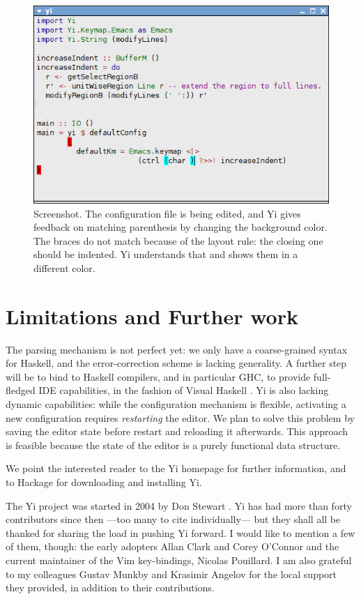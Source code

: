 \documentclass[9pt,indentedstyle]{sigplanconf}
\begin{document}
\begin{figure}
\includegraphics[width=\columnwidth]{screenshot}
\caption{Screenshot. The configuration file is being edited, and Yi
  gives feedback on matching parenthesis by changing the background
  color. The braces do not match because of the layout rule: the
  closing one should be indented. Yi understands that and shows them
  in a different color.}
\label{fig:screenshot}
\end{figure}

\section{Limitations and Further work}

The parsing mechanism is not perfect yet: we only have a coarse-grained
syntax for Haskell, and the error-correction scheme is lacking
generality.  A further step will be to bind to Haskell compilers, and
in particular GHC, to provide full-fledged IDE capabilities, in the
fashion of Visual Haskell \cite{Angelov2005VH}.
\vfill\eject
Yi is also lacking dynamic capabilities: while the configuration
mechanism is flexible, activating a new configuration requires {\em
  restarting} the editor.  We plan to solve this problem by saving the
editor state before restart and reloading it afterwards. This approach is
feasible because the state of the editor is a purely functional data
structure.

We point the interested reader to the Yi homepage \cite{YiHome} for
further information, and to Hackage \cite{Hackage} for downloading and
installing Yi.

\acks 

The Yi project was started in 2004 by Don Stewart
\cite{Stewart2005Dynamic}. Yi has had more than forty contributors
since then ---too many to cite individually--- but
they shall all be thanked for sharing the load in pushing Yi
forward. I would like to mention a few of them, though: the early
adopters Allan Clark and Corey O'Connor and the current maintainer of
the Vim key-bindings, Nicolas Pouillard. I am also grateful to my
colleagues Gustav Munkby and Krasimir Angelov for the local support
they provided, in addition to their contributions.
\end{document}
